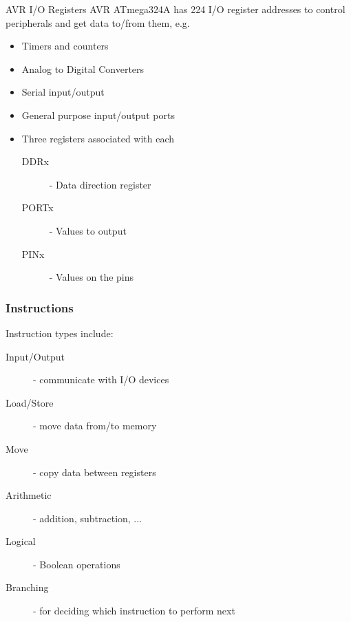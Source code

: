 \begin{note}{AVR I/O Registers}
AVR ATmega324A has 224 I/O register addresses to control peripherals and get data to/from them, e.g.
\begin{itemize}
	\item Timers and counters
	\item Analog to Digital Converters
	\item Serial input/output
	\item General purpose input/output ports
	\item Three registers associated with each
	\begin{description}
		\item[DDRx] - Data direction register
		\item[PORTx] - Values to output
		\item[PINx] - Values on the pins
	\end{description}	
\end{itemize}
\end{note}

\subsubsection{Instructions}
Instruction types include:
\begin{description}
	\item[Input/Output] - communicate with I/O devices
	\item[Load/Store] - move data from/to memory
	\item[Move] - copy data between registers
	\item[Arithmetic] - addition, subtraction, ...
	\item[Logical] - Boolean operations
	\item[Branching] - for deciding which instruction to perform next
\end{description}

